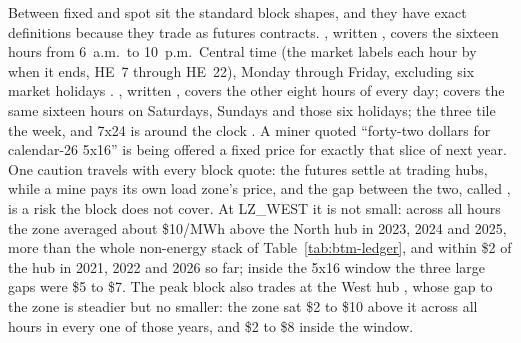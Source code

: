 Between fixed and spot sit the standard block shapes, and they have exact definitions because they trade as futures contracts. , written , covers the sixteen hours from 6~a.m.\ to 10~p.m.\ Central time (the market labels each hour by when it ends, HE~7 through HE~22), Monday through Friday, excluding six market holidays \autocite{ice2026ercotnorthpeak}. %
, written , covers the other eight hours of every day;  covers the same sixteen hours on Saturdays, Sundays and those six holidays; the three tile the week, and 7x24 is around the clock \autocite{ice2026ercotnorth7x8,ice2026ercotnorth2x16}. %
A miner quoted ``forty-two dollars for calendar-26 5x16'' is being offered a fixed price for exactly that slice of next year. One caution travels with every block quote: the futures settle at trading hubs, while a mine pays its own load zone's price, and the gap between the two, called , is a risk the block does not cover.
At LZ\_WEST it is not small: across all hours the zone averaged about \$10/MWh above the North hub in 2023, 2024 and 2025, more than the whole non-energy stack of Table~\ref{tab:btm-ledger}, and within \$2 of the hub in 2021, 2022 and 2026 so far; inside the 5x16 window the three large gaps were \$5 to \$7. %
The peak block also trades at the West hub \autocite{ice2026ercotwestpeak}, whose gap to the zone is steadier but no smaller: the zone sat \$2 to \$10 above it across all hours in every one of those years, and \$2 to \$8 inside the window. %

